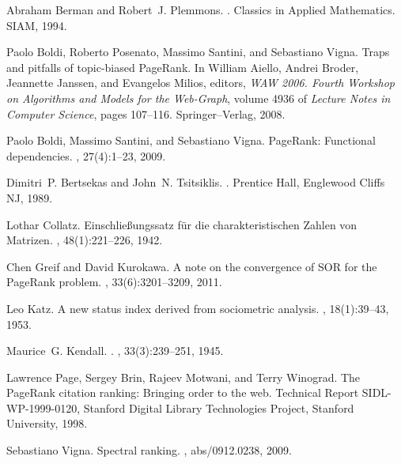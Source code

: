 \documentclass{article}
\newcommand{\1}{\mathbf 1}
\begin{document}
\begin{thebibliography}{PBMW98}

Abraham Berman and Robert~J. Plemmons.
.
\newblock Classics in Applied Mathematics. SIAM, 1994.

Paolo Boldi, Roberto Posenato, Massimo Santini, and Sebastiano Vigna.
\newblock Traps and pitfalls of topic-biased {P}age{R}ank.
\newblock In William Aiello, Andrei Broder, Jeannette Janssen, and Evangelos
  Milios, editors, {\em WAW 2006. Fourth Workshop on Algorithms and Models for
  the Web-Graph}, volume 4936 of {\em Lecture Notes in Computer Science}, pages
  107--116. Springer--Verlag, 2008.

Paolo Boldi, Massimo Santini, and Sebastiano Vigna.
\newblock Page{R}ank: {F}unctional dependencies.
, 27(4):1--23, 2009.

Dimitri~P. Bertsekas and John~N. Tsitsiklis.
.
\newblock Prentice Hall, Englewood Cliffs NJ, 1989.

Lothar Collatz.
\newblock Einschlie{\ss}ungssatz f{\"u}r die charakteristischen {Z}ahlen von
  {M}atrizen.
, 48(1):221--226, 1942.

Chen Greif and David Kurokawa.
\newblock A note on the convergence of {SOR} for the {P}age{R}ank problem.
, 33(6):3201--3209, 2011.

Leo Katz.
\newblock A new status index derived from sociometric analysis.
, 18(1):39--43, 1953.

Maurice~G. Kendall.
.
, 33(3):239--251, 1945.

Lawrence Page, Sergey Brin, Rajeev Motwani, and Terry Winograd.
\newblock The {P}age{R}ank citation ranking: Bringing order to the web.
\newblock Technical Report SIDL-WP-1999-0120, Stanford Digital Library
  Technologies Project, Stanford University, 1998.

Sebastiano Vigna.
\newblock Spectral ranking.
, abs/0912.0238, 2009.

\end{thebibliography}
\end{document}
